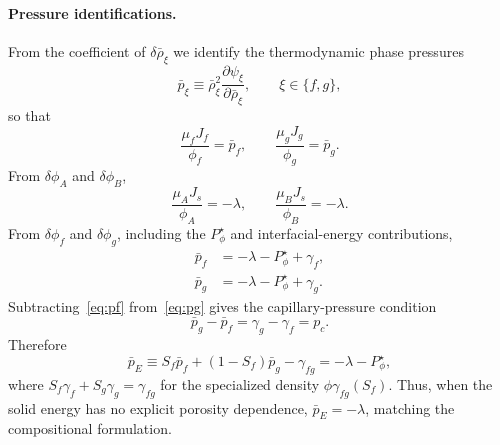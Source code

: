 \paragraph{Pressure identifications.}  From the coefficient of $\delta\bar\rho_\xi$ we identify the thermodynamic phase pressures
\begin{equation}
  \bar{p}_\xi \equiv \bar\rho_\xi^2\frac{\partial\psi_\xi}{\partial\bar\rho_\xi}, \qquad \xi \in \{f,g\},
  \label{eq:pbar_def}
\end{equation}
so that
\begin{equation}
  \frac{\mu_f J_f}{\phi_f} = \bar p_f, \qquad \frac{\mu_g J_g}{\phi_g} = \bar p_g.
  \label{eq:mu}
\end{equation}
From $\delta\phi_A$ and $\delta\phi_B$,
\begin{equation}
  \frac{\mu_A J_s}{\phi_A} = -\lambda, \qquad \frac{\mu_B J_s}{\phi_B} = -\lambda.
\end{equation}
From $\delta\phi_f$ and $\delta\phi_g$, including the $P^\star_\phi$ and
interfacial-energy contributions,
\begin{align}
  \bar p_f &= -\lambda - P^\star_\phi + \gamma_f,
  \label{eq:pf}
  \\
  \bar p_g &= -\lambda - P^\star_\phi + \gamma_g.
  \label{eq:pg}
\end{align}
Subtracting~\eqref{eq:pf} from~\eqref{eq:pg} gives the capillary-pressure
condition
\begin{equation}
  \bar p_g-\bar p_f = \gamma_g-\gamma_f = p_c .
  \label{eq:pc_from_phi_variations}
\end{equation}
Therefore
\begin{equation}
  \bar p_E \equiv S_f\bar p_f + (1-S_f)\bar p_g - \gamma_{fg}
  = -\lambda - P^\star_\phi,
  \label{eq:lambda}
\end{equation}
where $S_f\gamma_f+S_g\gamma_g=\gamma_{fg}$ for the specialized density
$\phi\gamma_{fg}(S_f)$.  Thus, when the solid energy has no explicit porosity
dependence, $\bar p_E=-\lambda$, matching the compositional formulation.

